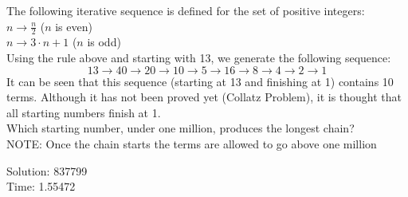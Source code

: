 \documentclass[12pt,letterpaper]{article}
\begin{document}
	

\begin{tcolorbox}[colback=gray!5!white,colframe=black!75!black,title=Problem]
	The following iterative sequence is defined for the set of positive integers:\\
	$n \rightarrow \frac{n}{2}$ ($n$ is even)\\
	$n \rightarrow 3\cdot n + 1$ ($n$ is odd)\\
	Using the rule above and starting with 13, we generate the following sequence:
	$$13 \rightarrow 40 \rightarrow 20 \rightarrow 10 \rightarrow 5 \rightarrow 16 \rightarrow 8 \rightarrow 4 \rightarrow 2 \rightarrow 1$$
	It can be seen that this sequence (starting at 13 and finishing at 1) contains 10 terms. Although it has not been proved yet (Collatz Problem), it is thought that all starting numbers finish at 1.\\
	Which starting number, under one million, produces the longest chain?\\
	NOTE: Once the chain starts the terms are allowed to go above one million
\end{tcolorbox}


\begin{tcolorbox}[colback=gray!5!white,colframe=black!75!black,title=Solution]
	Solution: 837799\\
	Time: 1.55472
\end{tcolorbox}
\end{document}
